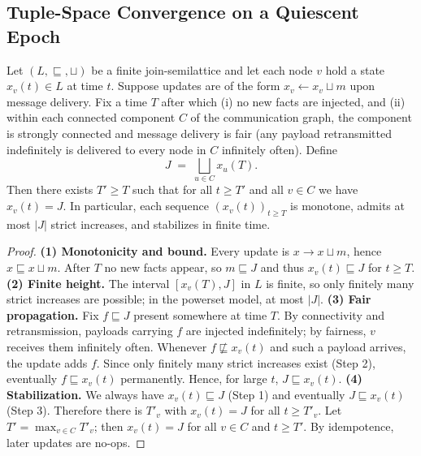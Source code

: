 \documentclass[runningheads]{llncs}
\begin{document}
\subsection{Tuple-Space Convergence on a Quiescent Epoch}
\begin{theorem}\label{thm:finiteheight}
Let $(L,\sqsubseteq,\sqcup)$ be a finite join-semilattice and let each node
$v$ hold a state $x_v(t)\in L$ at time $t$.
Suppose updates are of the form $x_v \gets x_v \sqcup m$ upon message delivery.
Fix a time $T$ after which (i) no new facts are injected, and
(ii) within each connected component $C$ of the communication graph,
the component is strongly connected and message delivery is fair
(any payload retransmitted indefinitely is delivered to every node in $C$ infinitely often).
Define
\[
J \;=\; \bigsqcup_{u\in C} x_u(T).
\]
Then there exists $T'\ge T$ such that for all $t\ge T'$ and all $v\in C$ we have
$x_v(t)=J$. In particular, each sequence $(x_v(t))_{t\ge T}$ is monotone, admits at most
$\lvert J\rvert$ strict increases, and stabilizes in finite time.
\end{theorem}

\begin{proof}
\textbf{(1) Monotonicity and bound.} Every update is $x\to x\sqcup m$, hence $x\sqsubseteq x\sqcup m$. After $T$ no new facts appear, so $m\sqsubseteq J$ and thus $x_v(t)\sqsubseteq J$ for $t\ge T$.
\medskip
\noindent
\textbf{(2) Finite height.} The interval $[x_v(T),J]$ in $L$ is finite, so only finitely many strict increases are possible; in the powerset model, at most $\lvert J\rvert$.
\medskip
\noindent
\textbf{(3) Fair propagation.} Fix $f\sqsubseteq J$ present somewhere at time $T$. By connectivity and retransmission, payloads carrying $f$ are injected indefinitely; by fairness, $v$ receives them infinitely often. Whenever $f\not\sqsubseteq x_v(t)$ and such a payload arrives, the update adds $f$. Since only finitely many strict increases exist (Step 2), eventually $f\sqsubseteq x_v(t)$ permanently. Hence, for large $t$, $J\sqsubseteq x_v(t)$.
\medskip
\noindent
\textbf{(4) Stabilization.} We always have $x_v(t)\sqsubseteq J$ (Step 1) and eventually $J\sqsubseteq x_v(t)$ (Step 3). Therefore there is $T'_v$ with $x_v(t)=J$ for all $t\ge T'_v$. Let $T'=\max_{v\in C}T'_v$; then $x_v(t)=J$ for all $v\in C$ and $t\ge T'$. By idempotence, later updates are no-ops.
\end{proof}
\end{document}
